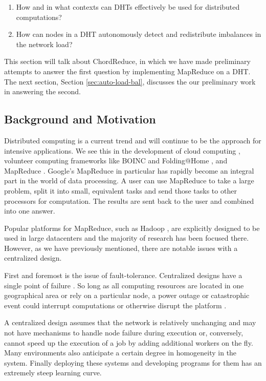 \begin{enumerate}
	\item How and in what contexts  can DHTs effectively be used for distributed computations?
	\item How can nodes in a DHT autonomously detect and redistribute imbalances in the network load?
\end{enumerate}

This section will talk about ChordReduce, in which we have made preliminary attempts to answer the first question by implementing MapReduce on a DHT.
The next section, Section \ref{sec:auto-load-bal}, discusses the our preliminary work in answering the second.

\subsection{Background and Motivation}

Distributed computing is a current trend and will continue to be the approach for intensive  applications.
We see this in the development of cloud computing \cite{p2p-cloud}, volunteer computing frameworks like BOINC \cite{anderson2004boinc} and Folding@Home \cite{larson2002folding}, and MapReduce  \cite{mapreduce}.
Google's MapReduce  in particular has rapidly become an integral part in the world of data processing.
A user can use MapReduce to take a large problem, split it into small, equivalent tasks and send those tasks to other processors for computation.
The results are sent back to the user and combined into one answer.

Popular platforms for MapReduce, such as Hadoop \cite{hadoop}  \cite{shvachko2010hadoop}, are explicitly designed to be used in large datacenters \cite{hadoopAssumptions} and the majority of research has been focused there.
However, as we have previously mentioned, there are notable issues with a centralized design.

First and foremost is the issue of fault-tolerance.
Centralized designs have a single point of failure \cite{shvachko2010hadoop}.
So long as all computing resources are located in one geographical area or rely on a particular node, a power outage or catastrophic event could interrupt computations or otherwise disrupt the platform \cite{babaoglu2014people}.

A centralized design assumes that the network is relatively unchanging and may not have mechanisms to handle node failure during execution or, conversely, cannot speed up the execution of a job by adding additional workers on the fly.
Many environments also anticipate a certain degree in homogeneity in the system.
Finally deploying these systems and developing programs for them has an extremely steep learning curve.

